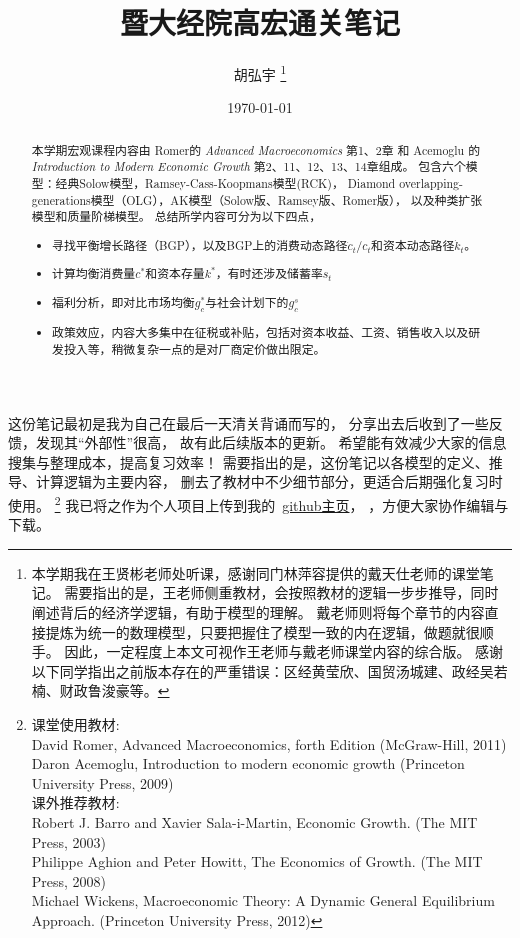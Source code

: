 \documentclass[cn,normal,11pt,black]{elegantnote}
\title{暨大经院高宏通关笔记}
\author{胡弘宇
\thanks{本学期我在王贤彬老师处听课，感谢同门林萍容提供的戴天仕老师的课堂笔记。
需要指出的是，王老师侧重教材，会按照教材的逻辑一步步推导，同时阐述背后的经济学逻辑，有助于模型的理解。
戴老师则将每个章节的内容直接提炼为统一的数理模型，只要把握住了模型一致的内在逻辑，做题就很顺手。
因此，一定程度上本文可视作王老师与戴老师课堂内容的综合版。
感谢以下同学指出之前版本存在的严重错误：区经黄莹欣、国贸汤城建、政经吴若楠、财政鲁浚豪等。}}
\institute{国贸系2018级}
\date{\today}
\begin{document}
\maketitle
{}

这份笔记最初是我为自己在最后一天清关背诵而写的，
分享出去后收到了一些反馈，发现其“外部性”很高，
故有此后续版本的更新。
希望能有效减少大家的信息搜集与整理成本，提高复习效率！
需要指出的是，这份笔记以各模型的定义、推导、计算逻辑为主要内容，
删去了教材中不少细节部分，更适合后期强化复习时使用。
\footnote{课堂使用教材:\\
David Romer, Advanced Macroeconomics, forth Edition (McGraw-Hill, 2011)\\
Daron Acemoglu, Introduction to modern economic growth (Princeton University Press, 2009) \\
课外推荐教材: \\
    Robert J. Barro and Xavier Sala-i-Martin, Economic Growth.
    (The MIT Press, 2003) \\
    Philippe Aghion and Peter Howitt, The Economics of Growth.
    (The MIT Press, 2008) \\
    Michael Wickens, Macroeconomic Theory: A Dynamic General Equilibrium Approach.
    (Princeton University Press, 2012)
}
我已将之作为个人项目上传到我的~\href{https://github.com/jun3970/MacroNote.JNU}{github主页}，
，方便大家协作编辑与下载。  


\renewcommand{\abstractname}{内容提要}
\begin{abstract}
本学期宏观课程内容由 Romer的 \textit{Advanced Macroeconomics} 第1、2章
和 Acemoglu 的 \textit{Introduction to Modern Economic Growth} 第2、11、12、13、14章组成。
包含六个模型：经典Solow模型，Ramsey-Cass-Koopmans模型(RCK)，
Diamond overlapping-generations模型（OLG），AK模型（Solow版、Ramsey版、Romer版），
以及种类扩张模型和质量阶梯模型。
总结所学内容可分为以下四点，
\begin{itemize}
    \item 寻找平衡增长路径（BGP），以及BGP上的消费动态路径$\dot{c}_t/c_t$和资本动态路径$\dot{k}_t$。
    \item 计算均衡消费量$c^*$和资本存量$k^*$，有时还涉及储蓄率$s_t$
    \item 福利分析，即对比市场均衡$g^*_c$与社会计划下的$g^s_c$
    \item 政策效应，内容大多集中在征税或补贴，包括对资本收益、工资、销售收入以及研发投入等，稍微复杂一点的是对厂商定价做出限定。
\end{itemize}
\end{abstract}
\end{document}
